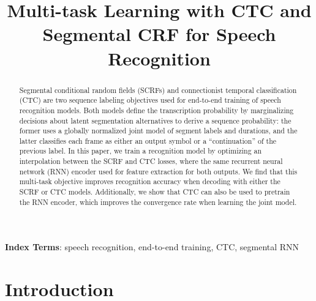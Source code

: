 \documentclass[a4paper]{article}
\title{Multi-task Learning with CTC and Segmental CRF for Speech Recognition}
\begin{document}
\maketitle
% 
\begin{abstract}
Segmental conditional random fields (SCRFs) and connectionist temporal classification (CTC) are two  sequence labeling objectives used for end-to-end training of speech recognition models. Both models define the transcription probability by marginalizing decisions about latent segmentation alternatives to derive a sequence probability: the former uses a globally normalized joint model of segment labels and durations, and the latter classifies each frame as either an output symbol or a ``continuation'' of the previous label.  In this paper, we train a recognition model by optimizing an interpolation between the SCRF and CTC losses, where the same recurrent neural network (RNN) encoder used for feature extraction for both outputs. We find that this multi-task objective improves recognition accuracy when decoding with either the SCRF or CTC models. Additionally, we show that CTC can also be used to pretrain the RNN encoder, which improves the convergence rate when learning the joint model. 
\end{abstract}
\noindent\textbf{Index Terms}: speech recognition, end-to-end training, CTC, segmental RNN

\section{Introduction}
\end{document}
